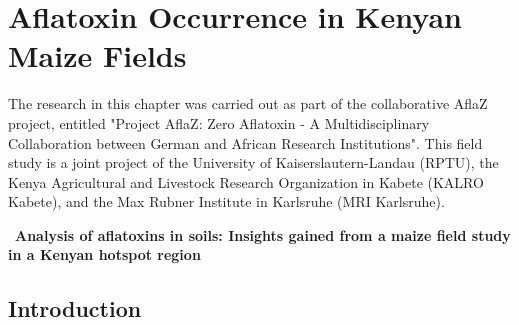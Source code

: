\chapter{Aflatoxin Occurrence in Kenyan Maize Fields} \label{Chapter3}

\begin{refsection} %

\vspace*{\fill}

\large
The research in this chapter was carried out as part of the collaborative AflaZ project, entitled "Project AflaZ: Zero Aflatoxin - A Multidisciplinary Collaboration between German and African Research Institutions". This field study is a joint project of the University of Kaiserslautern-Landau (RPTU), the Kenya Agricultural and Livestock Research Organization in Kabete (KALRO Kabete), and the Max Rubner Institute in Karlsruhe (MRI Karlsruhe).

\clearpage



{\raggedright 
\
\textbf{\LARGE Analysis of aflatoxins in soils: Insights gained from a maize field study in a Kenyan hotspot region}}

\section{Introduction}


\end{refsection}
